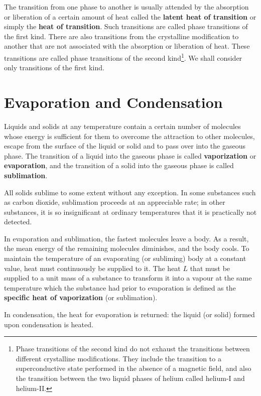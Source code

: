 The transition from one phase to another is usually attended by the absorption or liberation of a certain amount of heat called the \textbf{latent heat of transition} or simply the \textbf{heat of transition}. Such transitions are called phase transitions of the first kind. There are also transitions from the crystalline modification to another that are not associated with the absorption or liberation of heat. These transitions are called phase transitions of the second kind\footnote{Phase transitions of the second kind do not exhaust the transitions between different crystalline modifications. They include the transition to a superconductive state performed in the absence of a magnetic field, and also the transition between the two liquid phases of helium called helium-I and helium-II.}. We shall consider only transitions of the first kind.

\section{Evaporation and Condensation}\label{sec:15_2}

Liquids and solids at any temperature contain a certain number of molecules whose energy is sufficient for them to overcome the attraction to other molecules, escape from the surface of the liquid or solid and to pass over into the gaseous phase. The transition of a liquid into the gaseous phase is called \textbf{vaporization} or \textbf{evaporation}, and the transition of a solid into the gaseous phase is called \textbf{sublimation}.

All solids sublime to some extent without any exception. In some substances such as carbon dioxide, sublimation proceeds at an appreciable rate; in other substances, it is so insignificant at ordinary temperatures that it is practically not detected.

In evaporation and sublimation, the fastest molecules leave a body. As a result, the mean energy of the remaining molecules diminishes, and the body cools. To maintain the temperature of an evaporating (or subliming) body at a constant value, heat must continuously be supplied to it. The heat $L$ that must be supplied to a unit mass of a substance to transform it into a vapour at the same temperature which the substance had prior to evaporation is defined as the \textbf{specific heat of vaporization} (or sublimation).

In condensation, the heat for evaporation is returned: the liquid (or solid) formed upon condensation is heated.

